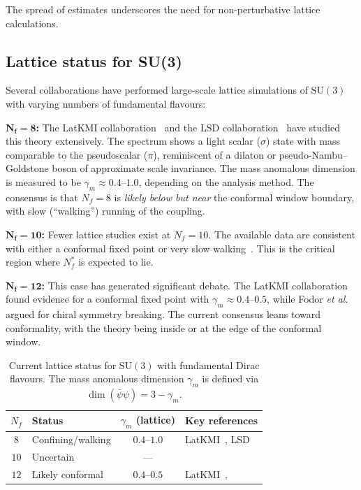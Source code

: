 \documentclass[11pt,a4paper]{article}
\theoremstyle{plain}
\theoremstyle{definition}
\theoremstyle{remark}
\newcommand{\Nf}{N_{\!f}}
\newcommand{\Nfstar}{\Nf^*}
\newcommand{\SU}[1]{\mathrm{SU}(#1)}
\begin{document}
The spread of estimates underscores the need for non-perturbative
lattice calculations.

\subsection{Lattice status for SU(3)}
\label{ssec:lattice-status}

Several collaborations have performed large-scale lattice simulations
of $\SU{3}$ with varying numbers of fundamental flavours:

\textbf{$\boldsymbol{\Nf = 8}$:}  The LatKMI
collaboration~\cite{LatKMI2014_Nf8} and the LSD
collaboration~\cite{LSD2014_Nf8} have studied this theory extensively.
The spectrum shows a light scalar ($\sigma$) state with mass comparable
to the pseudoscalar ($\pi$), reminiscent of a dilaton or
pseudo-Nambu--Goldstone boson of approximate scale invariance.
The mass anomalous dimension is measured to be $\gamma_m \approx
0.4$--$1.0$, depending on the analysis method.  The consensus is that
$\Nf = 8$ is \emph{likely below but near} the conformal window
boundary, with slow (``walking'') running of the coupling.

\textbf{$\boldsymbol{\Nf = 10}$:}  Fewer lattice studies exist at
$\Nf = 10$.  The available data are consistent with either a conformal
fixed point or very slow walking~\cite{Hayakawa2013,Cheng2013}.  This
is the critical region where $\Nfstar$ is expected to lie.

\textbf{$\boldsymbol{\Nf = 12}$:}  This case has generated
significant debate.  The LatKMI collaboration~\cite{LatKMI2016_Nf12}
found evidence for a conformal fixed point with $\gamma_m \approx
0.4$--$0.5$, while Fodor \textit{et al.}~\cite{Fodor2012} argued for
chiral symmetry breaking.  The current consensus leans toward
conformality, with the theory being inside or at the edge of the
conformal window.

\begin{table}[ht]
\centering
\renewcommand{\arraystretch}{1.3}
\caption{Current lattice status for $\SU{3}$ with fundamental Dirac
  flavours.  The mass anomalous dimension $\gamma_m$ is defined via
  $\dim(\bar\psi\psi) = 3 - \gamma_m$.}
\label{tab:lattice-status}
\begin{tabular}{@{} c l c l @{}}
\toprule
$\Nf$ & Status & $\gamma_m$ (lattice) & Key references \\
\midrule
$8$  & Confining/walking & $0.4$--$1.0$ &
  LatKMI~\cite{LatKMI2014_Nf8}, LSD~\cite{LSD2014_Nf8} \\
$10$ & Uncertain & --- &
  \cite{Hayakawa2013,Cheng2013} \\
$12$ & Likely conformal & $0.4$--$0.5$ &
  LatKMI~\cite{LatKMI2016_Nf12}, \cite{Fodor2012} \\
\bottomrule
\end{tabular}
\end{table}
\end{document}

